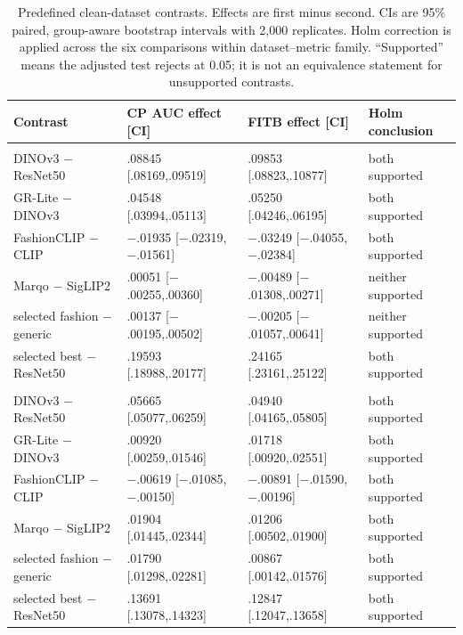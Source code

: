 \documentclass[pdflatex,sn-mathphys-num,iicol]{sn-jnl}
\begin{document}
\begin{table}[t]
\caption{Predefined clean-dataset contrasts. Effects are first minus second. CIs are 95\% paired, group-aware bootstrap intervals with 2,000 replicates. Holm correction is applied across the six comparisons within dataset--metric family. ``Supported'' means the adjusted test rejects at 0.05; it is not an equivalence statement for unsupported contrasts.}
\label{stab:effects}
\centering\small
\setlength{\tabcolsep}{2pt}\renewcommand{\arraystretch}{1.06}
\begin{tabularx}{\textwidth}{@{}>{\raggedright\arraybackslash}p{}>{\centering\arraybackslash}p{}>{\centering\arraybackslash}p{}>{\raggedright\arraybackslash}X@{}}
\toprule
Contrast & CP AUC effect [CI] & FITB effect [CI] & Holm conclusion \\
\midrule
\multicolumn{4}{@{}l}{\textit{Polyvore-D-Clean}} \\
DINOv3 $-$ ResNet50 & .08845 [.08169,.09519] & .09853 [.08823,.10877] & both supported \\
GR-Lite $-$ DINOv3 & .04548 [.03994,.05113] & .05250 [.04246,.06195] & both supported \\
FashionCLIP $-$ CLIP & $-$.01935 [$-$.02319,$-$.01561] & $-$.03249 [$-$.04055,$-$.02384] & both supported \\
Marqo $-$ SigLIP2 & .00051 [$-$.00255,.00360] & $-$.00489 [$-$.01308,.00271] & neither supported \\
selected fashion $-$ generic & .00137 [$-$.00195,.00502] & $-$.00205 [$-$.01057,.00641] & neither supported \\
selected best $-$ ResNet50 & .19593 [.18988,.20177] & .24165 [.23161,.25122] & both supported \\
\midrule
\multicolumn{4}{@{}l}{\textit{IQON3000-Clean}} \\
DINOv3 $-$ ResNet50 & .05665 [.05077,.06259] & .04940 [.04165,.05805] & both supported \\
GR-Lite $-$ DINOv3 & .00920 [.00259,.01546] & .01718 [.00920,.02551] & both supported \\
FashionCLIP $-$ CLIP & $-$.00619 [$-$.01085,$-$.00150] & $-$.00891 [$-$.01590,$-$.00196] & both supported \\
Marqo $-$ SigLIP2 & .01904 [.01445,.02344] & .01206 [.00502,.01900] & both supported \\
selected fashion $-$ generic & .01790 [.01298,.02281] & .00867 [.00142,.01576] & both supported \\
selected best $-$ ResNet50 & .13691 [.13078,.14323] & .12847 [.12047,.13658] & both supported \\
\bottomrule
\end{tabularx}
\end{table}
\end{document}
